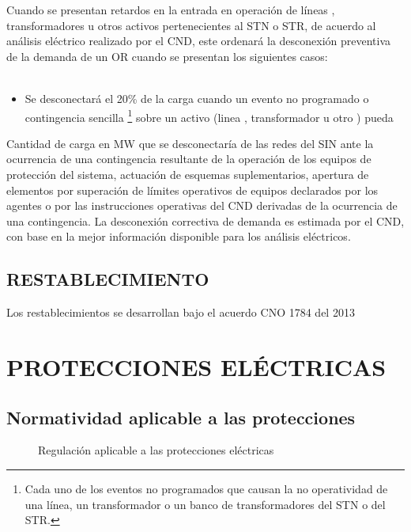 \documentclass[a5paper]{book}%
\begin{document}
Cuando se presentan retardos en la entrada  en operación de líneas , transformadores u otros activos pertenecientes al \ac{STN} o \ac{STR},  de acuerdo al análisis eléctrico  realizado por el \ac{CND},  este ordenará la desconexión preventiva de la demanda de un \ac{OR} cuando se presentan los siguientes casos: \cite{CREG2242016} \\\\

\begin{itemize}
\item Se desconectará el 20\% de la carga cuando un evento no programado o contingencia sencilla  \footnote[1]{Cada uno de los eventos no programados que causan la no operatividad de una línea, un transformador o un banco de transformadores del STN o del STR.}  sobre un activo (linea , transformador u otro ) pueda 
  \end{itemize}

Cantidad de carga en MW que se desconectaría de las redes del SIN ante la ocurrencia de una contingencia resultante de la operación de los equipos de protección del sistema, actuación de esquemas suplementarios, apertura de elementos por superación de límites operativos de equipos declarados por los agentes o por las instrucciones operativas del CND derivadas de la ocurrencia de una contingencia. La desconexión correctiva de demanda es estimada por el CND, con base en la mejor información disponible para los análisis eléctricos.

\section{RESTABLECIMIENTO}

Los restablecimientos se desarrollan bajo el acuerdo CNO 1784 del 2013

    \chapter{PROTECCIONES ELÉCTRICAS}
    
    \section{Normatividad aplicable a las protecciones}
    
    \begin{figure}[H]
    	\centering
    	\caption{Regulación aplicable a las protecciones eléctricas}
    	\label{fig:regulacionprotecciones}
    \end{figure}
    
\end{document}
